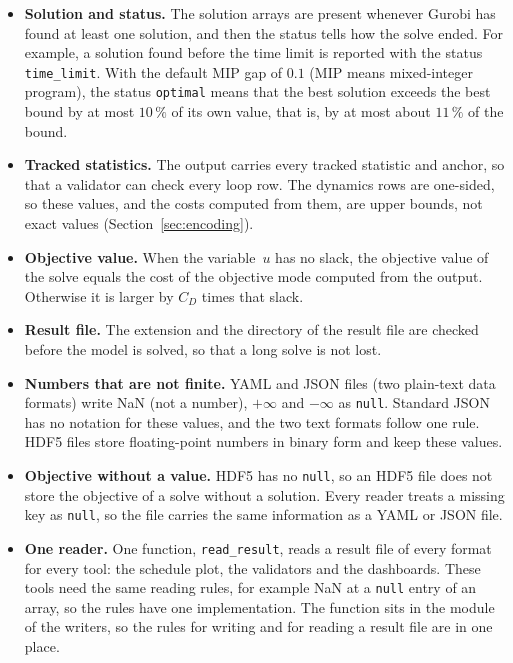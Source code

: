 \documentclass[11pt,a4paper]{article}
\theoremstyle{plain}
\theoremstyle{definition}
\theoremstyle{remark}
\begin{document}
\begin{itemize}
  \item \textbf{Solution and status.}
    The solution arrays are present whenever Gurobi has found at least one solution, and then the status tells how the solve ended.
    For example, a solution found before the time limit is reported with the status \texttt{time\_limit}.
    With the default MIP gap of $0.1$ (MIP means mixed-integer program), the status \texttt{optimal} means that the best solution exceeds the best bound by at most $10\,\%$ of its own value, that is, by at most about $11\,\%$ of the bound.
  \item \textbf{Tracked statistics.}
    The output carries every tracked statistic and anchor, so that a validator can check every loop row.
    The dynamics rows are one-sided, so these values, and the costs computed from them, are upper bounds, not exact values (Section~\ref{sec:encoding}).
  \item \textbf{Objective value.}
    When the variable~$u$ has no slack, the objective value of the solve equals the cost of the objective mode computed from the output.
    Otherwise it is larger by $C_D$ times that slack.
  \item \textbf{Result file.}
    The extension and the directory of the result file are checked before the model is solved, so that a long solve is not lost.
  \item \textbf{Numbers that are not finite.}
    YAML and JSON files (two plain-text data formats) write NaN (not a number), $+\infty$ and $-\infty$ as \texttt{null}.
    Standard JSON has no notation for these values, and the two text formats follow one rule.
    HDF5 files store floating-point numbers in binary form and keep these values.
  \item \textbf{Objective without a value.}
    HDF5 has no \texttt{null}, so an HDF5 file does not store the objective of a solve without a solution.
    Every reader treats a missing key as \texttt{null}, so the file carries the same information as a YAML or JSON file.
  \item \textbf{One reader.}
    One function, \texttt{read\_result}, reads a result file of every format for every tool: the schedule plot, the validators and the dashboards.
    These tools need the same reading rules, for example NaN at a \texttt{null} entry of an array, so the rules have one implementation.
    The function sits in the module of the writers, so the rules for writing and for reading a result file are in one place.
\end{itemize}
\end{document}
